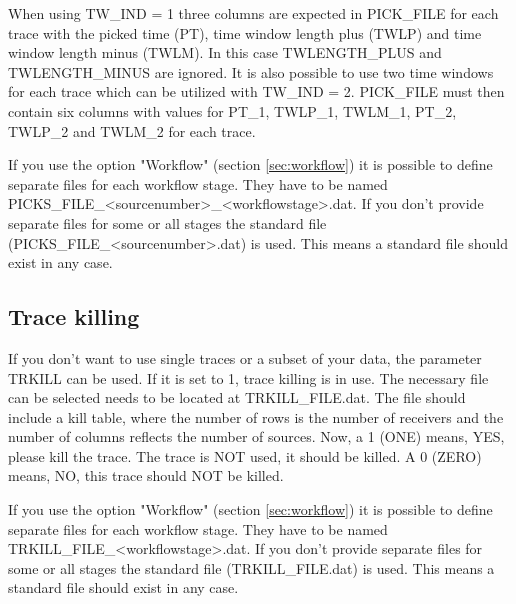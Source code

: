 When using TW\_IND = 1 three columns are expected in PICK\_FILE for each trace with the picked time (PT), time window length plus (TWLP) and time window length minus (TWLM). In this case TWLENGTH\_PLUS and TWLENGTH\_MINUS are ignored. It is also possible to use two time windows for each trace which can be utilized with TW\_IND = 2. PICK\_FILE must then contain six columns with values for PT\_1, TWLP\_1, TWLM\_1, PT\_2, TWLP\_2 and TWLM\_2 for each trace.

If you use the option "Workflow" (section \ref{sec:workflow}) it is possible to define separate files for each workflow stage. They have to be named PICKS\_FILE\_<sourcenumber>\_<workflowstage>.dat. If you don't provide separate files for some or all stages the standard file (PICKS\_FILE\_<sourcenumber>.dat) is used. This means a standard file should exist in any case.

\subsection{Trace killing}
\label{sec:trace_killing}
{\color{blue}{\begin{verbatim}
"Trace killing" : "comment",
			"TRKILL" : "0",
			"TRKILL_FILE" : "./trace_kill/trace_kill",
			
			"TRKILL_OFFSET" : "0",
			"TRKILL_OFFSET_LOWER" : "20",
			"TRKILL_OFFSET_UPPER" : "100",
\end{verbatim}}}

{\color{red}{\begin{verbatim}
Default values are:
	TRKILL=0
\end{verbatim}}}

If you don't want to use single traces or a subset of your data, the parameter TRKILL can be used. If it is set to 1, trace killing is in use. The necessary file can be selected needs to be located at TRKILL\_FILE.dat. The file should include a kill table, where the number of rows is the number of receivers and the number of columns reflects the number of sources. Now, a 1 (ONE) means, YES, please kill the trace. The trace is NOT used, it should be killed. A 0 (ZERO) means, NO, this trace should NOT be killed. 

If you use the option "Workflow" (section \ref{sec:workflow}) it is possible to define separate files for each workflow stage. They have to be named TRKILL\_FILE\_<workflowstage>.dat. If you don't provide separate files for some or all stages the standard file (TRKILL\_FILE.dat) is used. This means a standard file should exist in any case.

